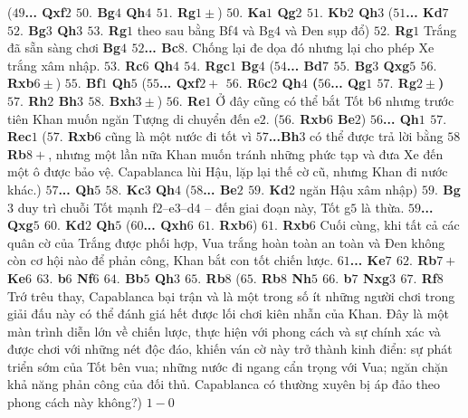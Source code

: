 \begin{multicols}{2}
	\vskip 0.1cm
	(\textbf{\color{gocco}$49$... Qxf$2$ $50.$ Bg$4$ Qh$4$ $51.$ Rg$1\pm$})
	\vskip 0.1cm
	\textbf{\color{gocco}$50.$ Ka$1$ Qg$2$ $51.$ Kb$2$ Qh$3$}
	\vskip 0.1cm 
	(\textbf{\color{gocco}$51$... Kd$7$ $52.$ Bg$3$ Qh$3$ $53.$ Rg$1$} theo sau bằng Bf$4$ và Bg$4$ và Đen sụp đổ)
	\vskip 0.1cm
	\textbf{\color{gocco}$52.$ Rg$1$} Trắng đã sẵn sàng chơi \textbf{\color{gocco}Bg$4$ $52$... Bc$8$}.  Chống lại đe dọa đó nhưng lại cho phép Xe trắng xâm nhập. \textbf{\color{gocco}$53.$ Rc$6$ Qh$4$ $54.$ Rgc$1$ Bg$4$}
	\vskip 0.1cm
	(\textbf{\color{gocco}$54$... Bd$7$ $55.$ Bg$3$ Qxg$5$ $56.$ Rxb$6\pm$})
	\vskip 0.1cm
	\textbf{\color{gocco}$55.$ Bf$1$ Qh$5$}
	\vskip 0.1cm
	(\textbf{\color{gocco}$55$... Qxf$2+$ $56.$ R$6$c$2$ Qh$4$ ($56$... Qg$1$ $57.$ Rg$2\pm$) $57.$ Rh$2$ Bh$3$ $58.$ Bxh$3\pm$}) 
	\vskip 0.1cm
	\textbf{\color{gocco}$56.$ Re$1$} Ở đây cũng có thể bắt Tốt b$6$ nhưng trước tiên Khan muốn ngăn Tượng di chuyển đến e$2$. 
	\vskip 0.1cm
	(\textbf{\color{gocco}$56.$ Rxb$6$ Be$2$}) 
	\vskip 0.1cm
	\textbf{\color{gocco}$56$... Qh$1$ $57.$ Rec$1$}
	\vskip 0.1cm
	(\textbf{\color{gocco}$57.$ Rxb$6$} cũng là một nước đi tốt vì \textbf{\color{gocco}$57$...Bh$3$} có thể được trả lời bằng \textbf{\color{gocco}$58$ Rb$8+$}, nhưng một lần nữa Khan muốn tránh những phức tạp và đưa Xe đến một ô được bảo vệ. Capablanca lùi Hậu, lặp lại thế cờ cũ, nhưng Khan đi nước khác.)  
	\vskip 0.1cm
	\textbf{\color{gocco}$57$... Qh$5$ $58.$ Kc$3$ Qh$4$}
	\vskip 0.1cm
	(\textbf{\color{gocco}$58$... Be$2$ $59.$ Kd$2$} ngăn Hậu xâm nhập)
	\vskip 0.1cm
	\textbf{\color{gocco}$59.$ Bg$3$} duy trì chuỗi Tốt mạnh f$2$--e$3$--d$4$ -- đến giai đoạn này, Tốt g$5$ là thừa.
	\vskip 0.1cm
	\textbf{\color{gocco}$59$... Qxg$5$ $60.$ Kd$2$ Qh$5$}
	\vskip 0.1cm
	(\textbf{\color{gocco}$60$... Qxh$6$ $61.$ Rxb$6$}) 
	\vskip 0.1cm
	\textbf{\color{gocco}$61.$ Rxb$6$} Cuối cùng, khi tất cả các quân cờ của Trắng được phối hợp, Vua trắng hoàn toàn an toàn và Đen không còn cơ hội nào để phản công, Khan bắt con tốt chiến lược. \textbf{\color{gocco}$61$... Ke$7$ $62.$ Rb$7+$ Ke$6$ $63.$ b$6$ Nf$6$ $64.$ Bb$5$ Qh$3$ $65.$ Rb$8$}
	\vskip 0.1cm
	(\textbf{\color{gocco}$65.$ Rb$8$ Nh$5$ $66.$ b$7$ Nxg$3$ $67.$ Rf$8$} Trớ trêu thay, Capablanca bại trận và là một trong số ít những người chơi trong giải đấu này có thể đánh giá hết được lối chơi kiên nhẫn của Khan. Đây là một màn trình diễn lớn về chiến lược, thực hiện với phong cách và sự chính xác và được chơi với những nét độc đáo, khiến ván cờ này  trở thành kinh điển: sự phát triển sớm của Tốt bên vua; những nước đi ngang cẩn trọng với Vua; ngăn chặn khả năng phản công của đối thủ. Capablanca có thường xuyên bị áp đảo theo phong cách này không?) 
	\vskip 0.1cm
	$1-0$
\end{multicols}





